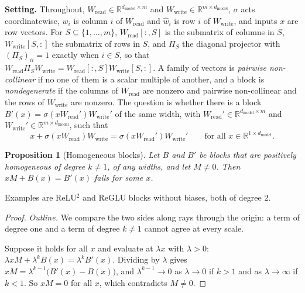 \documentclass[10pt]{article}
\newtheorem{proposition}[theorem]{Proposition}
\theoremstyle{definition}
\theoremstyle{remark}
\newcommand{\R}{\mathbb{R}}
\newcommand{\Wread}{W_{\mathrm{read}}}
\newcommand{\Wwrite}{W_{\mathrm{write}}}
\newcommand{\dm}{d_{\mathrm{model}}}
\newcommand{\para}[1]{\smallskip\noindent\textbf{#1}\hspace{0.5em}}
\begin{document}
\para{Setting.} Throughout, $\Wread \in \R^{\dm \times m}$ and $\Wwrite \in \R^{m \times \dm}$, $\sigma$ acts coordinatewise, $w_i$ is column $i$ of $\Wread$ and $\hat w_i$ is row $i$ of $\Wwrite$, and inputs $x$ are row vectors. For $S \subseteq \{1, \dots, m\}$, $\Wread[{:},S]$ is the submatrix of columns in $S$, $\Wwrite[S,{:}]$ the submatrix of rows in $S$, and $\Pi_S$ the diagonal projector with $(\Pi_S)_{ii} = 1$ exactly when $i \in S$, so that $\Wread\Pi_S\Wwrite = \Wread[{:},S]\Wwrite[S,{:}]$. A family of vectors is \emph{pairwise non-collinear} if no one of them is a scalar multiple of another, and a block is \emph{nondegenerate} if the columns of $\Wread$ are nonzero and pairwise non-collinear and the rows of $\Wwrite$ are nonzero. The question is whether there is a block $B'(x) = \sigma(x\Wread')\Wwrite'$ of the same width, with $\Wread' \in \R^{\dm\times m}$ and $\Wwrite' \in \R^{m \times \dm}$, such that
\begin{equation}\label{eq:absorb}
x + \sigma(x\Wread)\Wwrite = \sigma(x\Wread')\Wwrite'\qquad\text{for all } x \in \R^{1\times\dm} .
\end{equation}

\begin{proposition}[Homogeneous blocks]\label{prop:f2}
Let $B$ and $B'$ be blocks that are positively homogeneous of degree $k \neq 1$, of any widths, and let $M \neq 0$. Then $xM + B(x) = B'(x)$ fails for some $x$.
\end{proposition}
Examples are ReLU$^2$ and ReGLU blocks without biases, both of degree $2$.
\begin{proof}
\emph{Outline.} We compare the two sides along rays through the origin: a term of degree one and a term of degree $k \neq 1$ cannot agree at every scale.

Suppose it holds for all $x$ and evaluate at $\lambda x$ with $\lambda > 0$: $\lambda xM + \lambda^kB(x) = \lambda^kB'(x)$. Dividing by $\lambda$ gives $xM = \lambda^{k-1}\big(B'(x) - B(x)\big)$, and $\lambda^{k-1} \to 0$ as $\lambda \to 0$ if $k > 1$ and as $\lambda \to \infty$ if $k < 1$. So $xM = 0$ for all $x$, which contradicts $M \neq 0$.
\end{proof}
\end{document}
